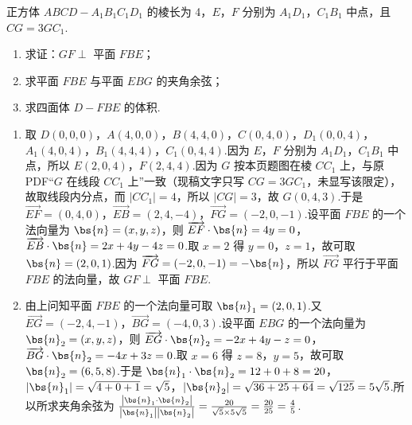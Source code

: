 \documentclass[UTF8,a4paper,oneside,11pt]{ctexbook}
\begin{document}
\begin{problem}
正方体 \(ABCD-A_1B_1C_1D_1\) 的棱长为 4，\(E\)，\(F\) 分别为 \(A_1D_1\)，\(C_1B_1\) 中点，且 \(CG=3GC_1\).

\begin{enumerate}
\item 求证：\(GF\perp\) 平面 \(FBE\)；
\item 求平面 \(FBE\) 与平面 \(EBG\) 的夹角余弦；
\item 求四面体 \(D-FBE\) 的体积.
\end{enumerate}

\end{problem}

\begin{solution}
\begin{enumerate}
\item 取 \(D\left(0,0,0\right)\)，\(A\left(4,0,0\right)\)，\(B\left(4,4,0\right)\)，\(C\left(0,4,0\right)\)，\(D_1\left(0,0,4\right)\)，\(A_1\left(4,0,4\right)\)，\(B_1\left(4,4,4\right)\)，\(C_1\left(0,4,4\right)\).因为 \(E\)，\(F\) 分别为 \(A_1D_1\)，\(C_1B_1\) 中点，所以 \(E\left(2,0,4\right)\)，\(F\left(2,4,4\right)\).因为 \(G\) 按本页题图在棱 \(CC_1\) 上，与原PDF“\(G\) 在线段 \(CC_1\) 上”一致（现稿文字只写 \(CG=3GC_1\)，未显写该限定），故取线段内分点，而 \(\left|CC_1\right|=4\)，所以 \(\left|CG\right|=3\)，故 \(G\left(0,4,3\right)\).于是 \(\overrightarrow{EF}=\left(0,4,0\right)\)，\(\overrightarrow{EB}=\left(2,4,-4\right)\)，\(\overrightarrow{FG}=\left(-2,0,-1\right)\).设平面 \(FBE\) 的一个法向量为 \(\bs{n}=\left(x,y,z\right)\)，则 \(\overrightarrow{EF}\cdot\bs{n}=4y=0\)，\(\overrightarrow{EB}\cdot\bs{n}=2x+4y-4z=0\).取 \(x=2\) 得 \(y=0\)，\(z=1\)，故可取 \(\bs{n}=\left(2,0,1\right)\).因为 \(\overrightarrow{FG}=\left(-2,0,-1\right)=-\bs{n}\)，所以 \(\overrightarrow{FG}\) 平行于平面 \(FBE\) 的法向量，故 \(GF\perp\) 平面 \(FBE\).
\item 由上问知平面 \(FBE\) 的一个法向量可取 \(\bs{n}_1=\left(2,0,1\right)\).又 \(\overrightarrow{EG}=\left(-2,4,-1\right)\)，\(\overrightarrow{BG}=\left(-4,0,3\right)\).设平面 \(EBG\) 的一个法向量为 \(\bs{n}_2=\left(x,y,z\right)\)，则 \(\overrightarrow{EG}\cdot\bs{n}_2=-2x+4y-z=0\)，\(\overrightarrow{BG}\cdot\bs{n}_2=-4x+3z=0\).取 \(x=6\) 得 \(z=8\)，\(y=5\)，故可取 \(\bs{n}_2=\left(6,5,8\right)\).于是 \(\bs{n}_1\cdot\bs{n}_2=12+0+8=20\)，\(\left|\bs{n}_1\right|=\sqrt{4+0+1}=\sqrt5\)，\(\left|\bs{n}_2\right|=\sqrt{36+25+64}=\sqrt{125}=5\sqrt5\).所以所求夹角余弦为 \(\frac{\left|\bs{n}_1\cdot\bs{n}_2\right|}{\left|\bs{n}_1\right|\left|\bs{n}_2\right|}=\frac{20}{\sqrt5\times 5\sqrt5}=\frac{20}{25}=\frac45\).

\end{enumerate}
\end{solution}
\end{document}
